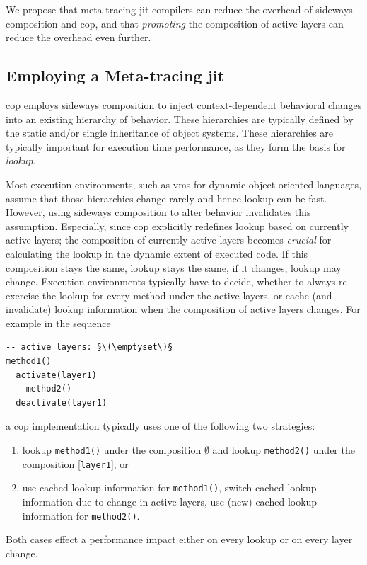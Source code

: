 \documentclass[preprint,english,10pt,nonatbib]{sigplanconf}
\begin{document}
We propose that meta-tracing \ac{jit} compilers can reduce the overhead of
sideways composition and \ac{cop}, and that \emph{promoting} the composition of
active layers can reduce the overhead even further.

\subsection{Employing a Meta-tracing \protect\acs{jit}}
\Acl{cop} employs sideways composition to inject context-dependent behavioral
changes into an existing hierarchy of behavior. These hierarchies are typically
defined by the static and/or single inheritance of object systems. These
hierarchies are typically important for execution time performance, as they
form the basis for \emph{lookup}.

Most execution environments, such as \acp{vm} for dynamic object-oriented
languages, assume that those hierarchies change rarely and hence lookup can be
fast. However, using sideways composition to alter behavior invalidates this
assumption. Especially, since \ac{cop} explicitly redefines lookup based on
currently active layers; the composition of currently active layers becomes
\emph{crucial} for calculating the lookup in the dynamic extent of executed
code. If this composition stays the same, lookup stays the same, if it changes,
lookup may change. Execution environments typically have to decide, whether to
always re-exercise the lookup for every method under the active layers, or
cache (and invalidate) lookup information when the composition of active layers
changes. For example in the sequence
\begin{lstlisting}
-- active layers: §\(\emptyset\)§
method1()
  activate(layer1)
    method2()
  deactivate(layer1)
\end{lstlisting}
a \ac{cop} implementation typically uses one of the following two strategies:
\begin{enumerate}
\item lookup \lstinline|method1()| under the composition
  \(\emptyset\)
  and lookup \lstinline|method2()| under the composition
  [\lstinline|layer1|], or
\item use cached lookup information for \lstinline|method1()|, switch cached
  lookup information due to change in active layers, use (new) cached lookup
  information for \lstinline|method2()|.
\end{enumerate}
Both cases effect a performance impact either on every lookup or on every
layer change.
\end{document}
